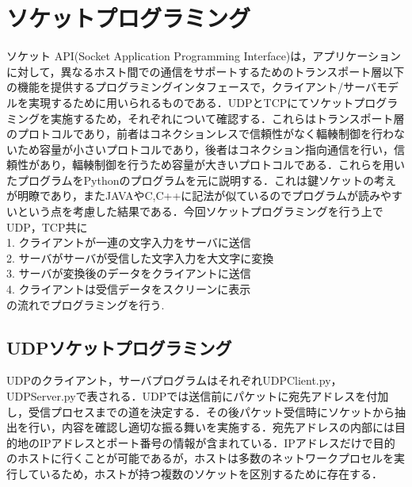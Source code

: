 \documentclass[9pt,a4j,twocolumn]{jsarticle}
\begin{document}
\section{ソケットプログラミング}
ソケット API(Socket Application Programming Interface)は，アプリケーションに対して，異なるホスト間での通信をサポートするためのトランスポート層以下の機能を提供するプログラミングインタフェースで，クライアント/サーバモデルを実現するために用いられるものである．UDPとTCPにてソケットプログラミングを実施するため，それぞれについて確認する．これらはトランスポート層のプロトコルであり，前者はコネクションレスで信頼性がなく輻輳制御を行わないため容量が小さいプロトコルであり，後者はコネクション指向通信を行い，信頼性があり，輻輳制御を行うため容量が大きいプロトコルである．これらを用いたプログラムをPythonのプログラムを元に説明する．これは鍵ソケットの考えが明瞭であり，またJAVAやC,C++に記法が似ているのでプログラムが読みやすいという点を考慮した結果である．今回ソケットプログラミングを行う上でUDP，TCP共に\\
1. クライアントが一連の文字入力をサーバに送信　\\
2. サーバがサーバが受信した文字入力を大文字に変換 \\
3. サーバが変換後のデータをクライアントに送信\\
4. クライアントは受信データをスクリーンに表示　\\
の流れでプログラミングを行う.\\
\subsection{UDPソケットプログラミング}
UDPのクライアント，サーバプログラムはそれぞれUDPClient.py，UDPServer.pyで表される．UDPでは送信前にパケットに宛先アドレスを付加し，受信プロセスまでの道を決定する．その後パケット受信時にソケットから抽出を行い，内容を確認し適切な振る舞いを実施する．宛先アドレスの内部には目的地のIPアドレスとポート番号の情報が含まれている．IPアドレスだけで目的のホストに行くことが可能であるが，ホストは多数のネットワークプロセルを実行しているため，ホストが持つ複数のソケットを区別するために存在する．\\
\end{document}
